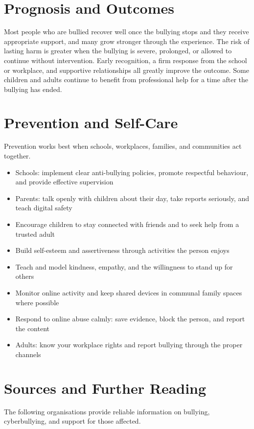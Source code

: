 \section*{Prognosis and Outcomes}
Most people who are bullied recover well once the bullying stops and they receive appropriate support, and many grow stronger through the experience. The risk of lasting harm is greater when the bullying is severe, prolonged, or allowed to continue without intervention. Early recognition, a firm response from the school or workplace, and supportive relationships all greatly improve the outcome. Some children and adults continue to benefit from professional help for a time after the bullying has ended.

\section*{Prevention and Self-Care}
Prevention works best when schools, workplaces, families, and communities act together.

\begin{itemize}
    \item Schools: implement clear anti-bullying policies, promote respectful behaviour, and provide effective supervision
    \item Parents: talk openly with children about their day, take reports seriously, and teach digital safety
    \item Encourage children to stay connected with friends and to seek help from a trusted adult
    \item Build self-esteem and assertiveness through activities the person enjoys
    \item Teach and model kindness, empathy, and the willingness to stand up for others
    \item Monitor online activity and keep shared devices in communal family spaces where possible
    \item Respond to online abuse calmly: save evidence, block the person, and report the content
    \item Adults: know your workplace rights and report bullying through the proper channels
\end{itemize}

\section*{Sources and Further Reading}
The following organisations provide reliable information on bullying, cyberbullying, and support for those affected.

